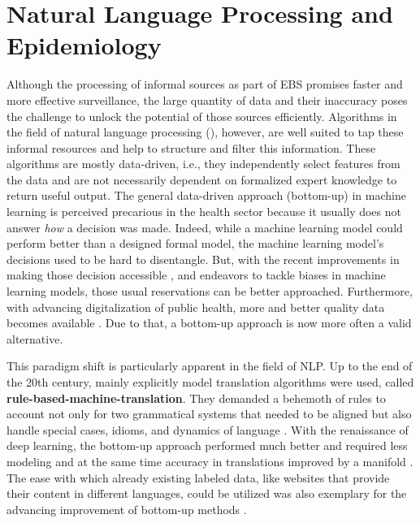 \section{Natural Language Processing and Epidemiology}
  Although the processing of informal sources as part of EBS promises faster and more effective surveillance, the large quantity of data and their inaccuracy poses the challenge to unlock the potential of those sources efficiently.
  Algorithms in the field of natural language processing (), however, are well suited to tap these informal resources and help to structure and filter this information.
  These algorithms are mostly data-driven, i.e., they independently select features from the data and are not necessarily dependent on formalized expert knowledge to return useful output.
  The general data-driven approach (bottom-up) in machine learning is perceived precarious in the health sector because it usually does not answer \emph{how} a decision was made.
  Indeed, while a machine learning model could perform better than a designed formal model, the machine learning model's decisions used to be hard to disentangle.
  But, with the recent improvements in making those decision accessible \citep{Arras2017}, and endeavors to tackle biases in machine learning models, those usual reservations can be better approached.
  Furthermore, with advancing digitalization of public health, more and better quality data becomes available \citep{DEMIS}.
  Due to that, a bottom-up approach is now more often a valid alternative.

  This paradigm shift is particularly apparent in the field of NLP.
  Up to the end of the 20th century, mainly explicitly model translation algorithms were used, called \textbf{rule-based-machine-translation}.
  They demanded a behemoth of rules to account not only for two grammatical systems that needed to be aligned but also handle special cases, idioms, and dynamics of language \citep{Bar-Hillel1953, Bar-Hillel1960}.
  With the renaissance of deep learning, the bottom-up approach performed much better and required less modeling and at the same time accuracy in translations improved by a manifold \citep{Bengio2003}.
  The ease with which already existing labeled data, like websites that provide their content in different languages, could be utilized was also exemplary for the advancing improvement of bottom-up methods \citep{Macklovitch00}.

